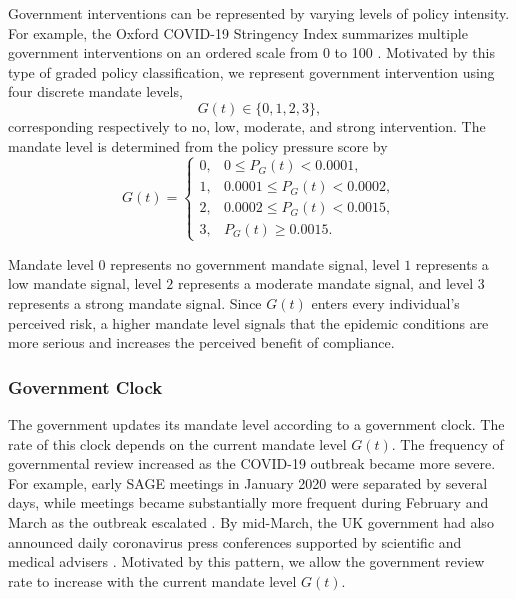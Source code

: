 \documentclass[11pt]{article}
\theoremstyle{definition}
\theoremstyle{plain}
\begin{document}
Government interventions can be represented by varying levels of policy
intensity. For example, the Oxford COVID-19 Stringency Index summarizes
multiple government interventions on an ordered scale from 0 to 100
\cite{hale2021,roser2021}. Motivated by this type of graded policy
classification, we represent government intervention using four discrete
mandate levels,
\[
G(t)\in\{0,1,2,3\},
\]
corresponding respectively to no, low, moderate, and strong intervention.
The mandate level is determined from the policy pressure score by
\begin{equation}\label{eq:mandate}
G(t)=
\begin{cases}
0, & 0\leq P_G(t)<0.0001,\\
1, & 0.0001\leq P_G(t)<0.0002,\\
2, & 0.0002\leq P_G(t)<0.0015,\\
3, & P_G(t)\geq 0.0015.
\end{cases}
\end{equation}


Mandate level $0$ represents no government mandate signal, level $1$ represents a low mandate signal, level $2$ represents a moderate mandate signal, and level $3$ represents a strong mandate signal. Since $G(t)$ enters every individual's perceived risk, a higher mandate level signals that the epidemic conditions are more serious and increases the perceived benefit of compliance.

\subsubsection{Government Clock}
\label{sec:govclock}

The government updates its mandate level according to a government clock. The rate of this clock depends on the current mandate level $G(t)$. The frequency of governmental review increased as the COVID-19 outbreak
became more severe. For example, early SAGE meetings in January 2020 were
separated by several days, while meetings became substantially more frequent
during February and March as the outbreak escalated
\cite{sagejan2020,sagefeb2020}. By mid-March, the UK government had also
announced daily coronavirus press conferences supported by scientific and
medical advisers \cite{primeministerdrive2020}. Motivated by this pattern,
we allow the government review rate to increase with the current mandate
level $G(t)$.
\end{document}
